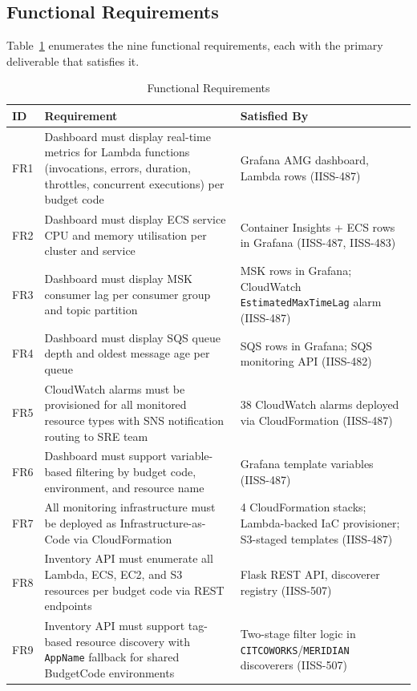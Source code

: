 \subsection{Functional Requirements}

Table~\ref{tab:functional_requirements} enumerates the nine functional
requirements, each with the primary deliverable that satisfies it.

\begin{table}[ht]
\centering
\caption{Functional Requirements}
\label{tab:functional_requirements}
\begin{tabular}{p{0.8cm}p{6.8cm}p{4.5cm}}
\toprule
\textbf{ID} & \textbf{Requirement} & \textbf{Satisfied By} \\
\midrule
FR1 & Dashboard must display real-time metrics for Lambda functions (invocations, errors, duration, throttles, concurrent executions) per budget code & Grafana AMG dashboard, Lambda rows (IISS-487) \\
\midrule
FR2 & Dashboard must display ECS service CPU and memory utilisation per cluster and service & Container Insights + ECS rows in Grafana (IISS-487, IISS-483) \\
\midrule
FR3 & Dashboard must display MSK consumer lag per consumer group and topic partition & MSK rows in Grafana; CloudWatch \texttt{EstimatedMaxTimeLag} alarm (IISS-487) \\
\midrule
FR4 & Dashboard must display SQS queue depth and oldest message age per queue & SQS rows in Grafana; SQS monitoring API (IISS-482) \\
\midrule
FR5 & CloudWatch alarms must be provisioned for all monitored resource types with SNS notification routing to SRE team & 38 CloudWatch alarms deployed via CloudFormation (IISS-487) \\
\midrule
FR6 & Dashboard must support variable-based filtering by budget code, environment, and resource name & Grafana template variables (IISS-487) \\
\midrule
FR7 & All monitoring infrastructure must be deployed as Infrastructure-as-Code via CloudFormation & 4 CloudFormation stacks; Lambda-backed IaC provisioner; S3-staged templates (IISS-487) \\
\midrule
FR8 & Inventory API must enumerate all Lambda, ECS, EC2, and S3 resources per budget code via REST endpoints & Flask REST API, discoverer registry (IISS-507) \\
\midrule
FR9 & Inventory API must support tag-based resource discovery with \texttt{AppName} fallback for shared BudgetCode environments & Two-stage filter logic in \texttt{CITCOWORKS}/\texttt{MERIDIAN} discoverers (IISS-507) \\
\bottomrule
\end{tabular}
\end{table}

